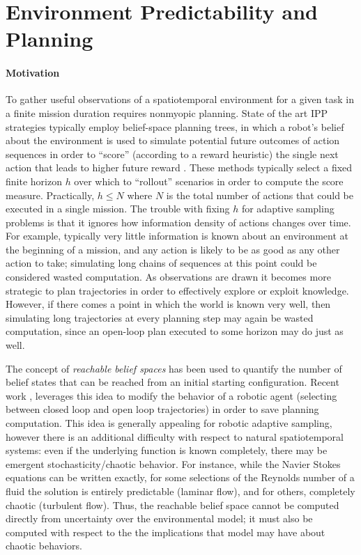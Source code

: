 \section{Environment Predictability and Planning}

\paragraph{Motivation}
To gather useful observations of a spatiotemporal environment for a given task in a finite mission duration requires nonmyopic planning.
State of the art IPP strategies typically employ belief-space planning trees, in which a robot's belief about the environment is used to simulate potential future outcomes of action sequences in order to ``score'' (according to a reward heuristic) the single next action that leads to higher future reward \autocite{sunberg2018online,morere2018continuous,Arora2017}.
These methods typically select a fixed finite horizon $h$ over which to ``rollout'' scenarios in order to compute the score measure.
Practically, $h \leq N$ where $N$ is the total number of actions that could be executed in a single mission.
The trouble with fixing $h$ for adaptive sampling problems is that it ignores how information density of actions changes over time.
For example, typically very little information is known about an environment at the beginning of a mission, and any action is likely to be as good as any other action to take; simulating long chains of sequences at this point could be considered wasted computation.
As observations are drawn it becomes more strategic to plan trajectories in order to effectively explore or exploit knowledge.
However, if there comes a point in which the world is known very well, then simulating long trajectories at every planning step may again be wasted computation, since an open-loop plan executed to some horizon may do just as well.

The concept of \emph{reachable belief spaces} \autocite{kurniawati2008sarsop} has been used to quantify the number of belief states that can be reached from an initial starting configuration.
Recent work \autocite{flaspohler2020belief}, leverages this idea to modify the behavior of a robotic agent (selecting between closed loop and open loop trajectories) in order to save planning computation.
This idea is generally appealing for robotic adaptive sampling, however there is an additional difficulty with respect to natural spatiotemporal systems: even if the underlying function is known completely, there may be emergent stochasticity/chaotic behavior.
For instance, while the Navier Stokes equations can be written exactly, for some selections of the Reynolds number of a fluid the solution is entirely predictable (laminar flow), and for others, completely chaotic (turbulent flow).
Thus, the reachable belief space cannot be computed directly from uncertainty over the environmental model; it must also be computed with respect to the the implications that model may have about chaotic behaviors.

